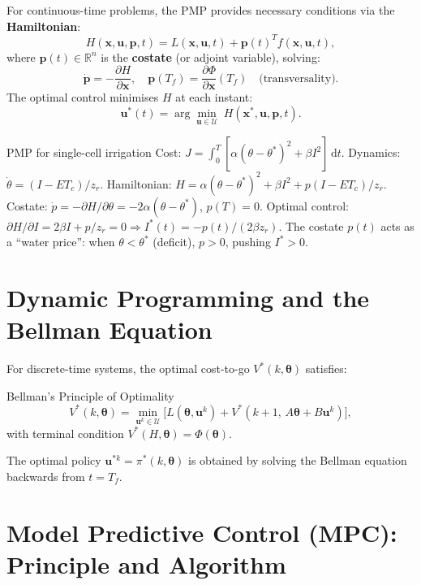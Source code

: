 \documentclass[12pt,a4paper,openany]{book}
\newcommand{\R}{\mathbb{R}}
\newcommand{\bx}{\bm{x}}
\newcommand{\bu}{\bm{u}}
\newcommand{\bth}{\bm{\theta}}
\newcommand{\dt}{\,\mathrm{d}t}
\begin{document}
For continuous-time problems, the PMP provides necessary conditions via the \textbf{Hamiltonian}:
\begin{equation}
  H(\bx,\bu,\bm{p},t) = L(\bx,\bu,t) + \bm{p}(t)^T f(\bx,\bu,t),
\end{equation}
where $\bm{p}(t)\in\R^n$ is the \textbf{costate} (or adjoint variable), solving:
\begin{equation}
  \dot{\bm{p}} = -\frac{\partial H}{\partial \bx},\quad\bm{p}(T_f)=\frac{\partial\Phi}{\partial\bx}(T_f)\quad\text{(transversality)}.
\end{equation}
The optimal control minimises $H$ at each instant:
\begin{equation}
  \bu^*(t) = \arg\min_{\bu\in\mathcal{U}}\;H(\bx^*,\bu,\bm{p},t).
\end{equation}

\begin{exbox}{PMP for single-cell irrigation}
Cost: $J=\int_0^{T}[\alpha(\theta-\theta^*)^2+\beta I^2]\dt$. Dynamics: $\dot\theta=(I-ET_c)/z_r$.
Hamiltonian: $H=\alpha(\theta-\theta^*)^2+\beta I^2+p(I-ET_c)/z_r$.
Costate: $\dot p=-\partial H/\partial\theta=-2\alpha(\theta-\theta^*)$, $p(T)=0$.
Optimal control: $\partial H/\partial I=2\beta I+p/z_r=0\Rightarrow I^*(t)=-p(t)/(2\beta z_r)$.
The costate $p(t)$ acts as a ``water price'': when $\theta<\theta^*$ (deficit), $p>0$, pushing $I^*>0$.
\end{exbox}

\section{Dynamic Programming and the Bellman Equation}

For discrete-time systems, the optimal cost-to-go $V^*(k,\bth)$ satisfies:

\begin{thmbox}{Bellman's Principle of Optimality}
\begin{equation}
  V^*(k,\bth) = \min_{\bu^k\in\mathcal{U}}\bigl[L(\bth,\bu^k)+V^*(k+1,\,A\bth+B\bu^k)\bigr],
\end{equation}
with terminal condition $V^*(H,\bth)=\Phi(\bth)$.
\end{thmbox}

The optimal policy $\bu^{*k}=\pi^*(k,\bth)$ is obtained by solving the Bellman equation backwards from $t=T_f$.

\section{Model Predictive Control (MPC): Principle and Algorithm}
\end{document}
